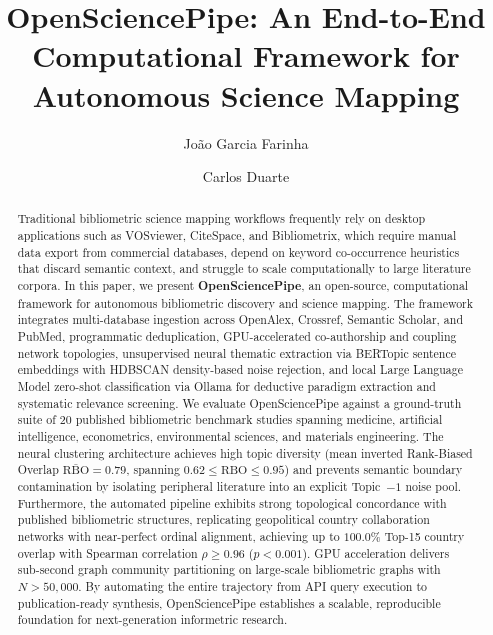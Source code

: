 \documentclass[preprint,12pt]{elsarticle}
\begin{document}
\begin{frontmatter}

\title{OpenSciencePipe: An End-to-End Computational Framework for Autonomous Science Mapping}

\author[inst1]{João Garcia Farinha}
\author[inst1]{Carlos Duarte}


\begin{abstract}
Traditional bibliometric science mapping workflows frequently rely on desktop applications such as VOSviewer, CiteSpace, and Bibliometrix, which require manual data export from commercial databases, depend on keyword co-occurrence heuristics that discard semantic context, and struggle to scale computationally to large literature corpora. In this paper, we present \textbf{OpenSciencePipe}, an open-source, computational framework for autonomous bibliometric discovery and science mapping. The framework integrates multi-database ingestion across OpenAlex, Crossref, Semantic Scholar, and PubMed, programmatic deduplication, GPU-accelerated co-authorship and coupling network topologies, unsupervised neural thematic extraction via BERTopic sentence embeddings with HDBSCAN density-based noise rejection, and local Large Language Model zero-shot classification via Ollama for deductive paradigm extraction and systematic relevance screening. We evaluate OpenSciencePipe against a ground-truth suite of 20 published bibliometric benchmark studies spanning medicine, artificial intelligence, econometrics, environmental sciences, and materials engineering. The neural clustering architecture achieves high topic diversity (mean inverted Rank-Biased Overlap $\bar{\text{RBO}} = 0.79$, spanning $0.62 \le \text{RBO} \le 0.95$) and prevents semantic boundary contamination by isolating peripheral literature into an explicit Topic~$-1$ noise pool. Furthermore, the automated pipeline exhibits strong topological concordance with published bibliometric structures, replicating geopolitical country collaboration networks with near-perfect ordinal alignment, achieving up to $100.0\%$ Top-15 country overlap with Spearman correlation $\rho \ge 0.96$ ($p < 0.001$). GPU acceleration delivers sub-second graph community partitioning on large-scale bibliometric graphs with $N > 50,000$. By automating the entire trajectory from API query execution to publication-ready synthesis, OpenSciencePipe establishes a scalable, reproducible foundation for next-generation informetric research.
\end{abstract} 



\end{frontmatter}
\end{document}
